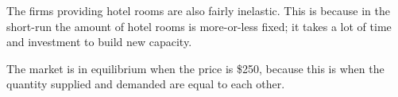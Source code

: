 \documentclass[12pt]{article}
\begin{document}
\vspace{2mm}

The firms providing hotel rooms are also fairly inelastic. This is because in the short-run the amount of hotel rooms is more-or-less fixed; it takes a lot of time and investment to build new capacity.

\vspace{2mm}

The market is in equilibrium when the price is \$250, because this is when the quantity supplied and demanded are equal to each other.
\end{document}
